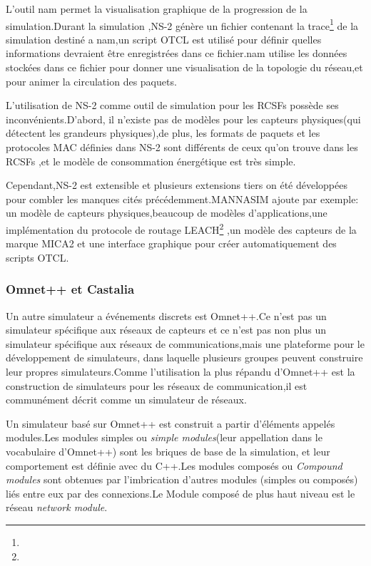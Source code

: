L'outil nam permet la visualisation graphique de la progression de la simulation.Durant la simulation ,NS-2 génère un fichier  contenant la trace\footnote{} de la simulation destiné a nam,un script OTCL est utilisé pour définir quelles informations devraient être enregistrées dans ce fichier.nam utilise les données stockées dans ce fichier pour donner une visualisation de la topologie du réseau,et pour animer la circulation des paquets.

L'utilisation de NS-2 comme outil de simulation pour les RCSFs possède ses inconvénients.D'abord, il n'existe pas  de modèles pour les capteurs physiques(qui détectent les grandeurs physiques),de plus, les formats de paquets et les protocoles MAC définies dans NS-2 sont différents de ceux qu'on trouve dans les RCSFs ,et le modèle de consommation énergétique est très simple.

Cependant,NS-2 est extensible et plusieurs extensions tiers on été développées pour combler les manques cités précédemment.MANNASIM ajoute par exemple: un modèle de capteurs physiques,beaucoup de modèles d'applications,une implémentation du protocole de routage LEACH\footnote{} ,un modèle des capteurs de la marque MICA2 et une interface graphique pour créer automatiquement des scripts OTCL.

\subsubsection{Omnet++ et Castalia}
Un autre simulateur a événements discrets est Omnet++.Ce n'est pas un simulateur spécifique aux réseaux de capteurs et ce n'est pas non plus un simulateur spécifique aux réseaux de communications,mais une plateforme pour le développement de simulateurs, dans laquelle plusieurs groupes peuvent construire leur propres simulateurs.Comme l'utilisation la plus répandu d'Omnet++ est la construction de simulateurs pour les réseaux de communication,il est communément décrit comme un simulateur de réseaux.

Un simulateur basé sur Omnet++ est construit a partir d'éléments appelés modules.Les modules simples ou \emph{simple modules}(leur appellation dans le vocabulaire d'Omnet++) sont les briques de base de la simulation, et leur comportement est définie avec du C++.Les modules composés ou \emph{Compound modules} sont obtenues par l'imbrication d'autres modules (simples ou composés) liés entre eux par des connexions.Le Module composé de plus haut niveau est le réseau \emph{network module}.

